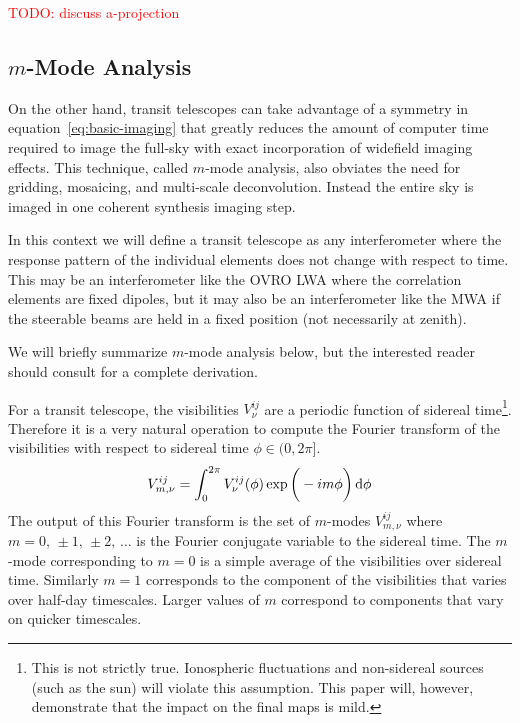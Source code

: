 \documentclass[twocolumn]{aastex6}
\renewcommand{\d}{{\rm d}}
\newcommand{\todo}[1]{\textcolor{red}{TODO: #1}\PackageWarning{TODO:}{#1!}}
\begin{document}
\todo{discuss a-projection}

\citet{2017MNRAS.465.2901Z}

\subsection{$m$-Mode Analysis}

On the other hand, transit telescopes can take advantage of a symmetry in
equation~\ref{eq:basic-imaging} that greatly reduces the amount of computer time required to image
the full-sky with exact incorporation of widefield imaging effects. This technique, called $m$-mode
analysis, also obviates the need for gridding, mosaicing, and multi-scale deconvolution. Instead the
entire sky is imaged in one coherent synthesis imaging step.

In this context we will define a transit telescope as any interferometer where the response pattern
of the individual elements does not change with respect to time. This may be an interferometer like
the OVRO LWA where the correlation elements are fixed dipoles, but it may also be an interferometer
like the MWA if the steerable beams are held in a fixed position (not necessarily at zenith).

We will briefly summarize $m$-mode analysis below, but the interested reader should consult
\citet{2014ApJ...781...57S, 2015PhRvD..91h3514S} for a complete derivation.

For a transit telescope, the visibilities $V^{ij}_\nu$ are a periodic function of sidereal
time\footnote{
    This is not strictly true. Ionospheric fluctuations and non-sidereal sources (such as the sun)
    will violate this assumption. This paper will, however, demonstrate that the impact on the final
    maps is mild.
}.
Therefore it is a very natural operation to compute the Fourier transform of the visibilities with
respect to sidereal time $\phi\in(0,2\pi]$.
\begin{equation}
    V^{ij}_{m,\nu} = \int_0^{2\pi} V^{ij}_\nu(\phi)\exp\bigg(-im\phi\bigg)\,\d\phi
\end{equation}
The output of this Fourier transform is the set of $m$-modes $V^{ij}_{m,\nu}$ where
$m=0,\,\pm1,\,\pm2,\,\ldots$ is the Fourier conjugate variable to the sidereal time. The $m$-mode
corresponding to $m=0$ is a simple average of the visibilities over sidereal time. Similarly $m=1$
corresponds to the component of the visibilities that varies over half-day timescales. Larger values
of $m$ correspond to components that vary on quicker timescales.
\end{document}
